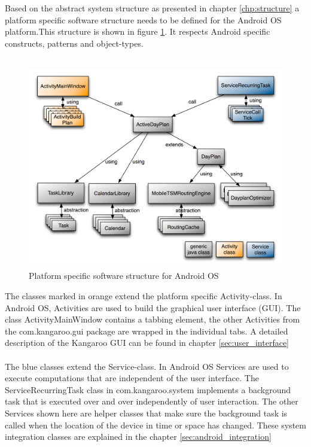 Based on the abstract system structure as presented in chapter \ref{chp:structure} a platform specific software structure needs to be defined for the Android OS platform.This structure is shown in figure \ref{android_structure}. It respects Android specific constructs, patterns and object-types.\\\\
\begin{figure}[h!]
\centering
\includegraphics[width=14cm]{pics/android_structure.png}
\caption{Platform specific software structure for Android OS}
\label{android_structure}
\end{figure}
The classes marked in orange extend the platform specific Activity-class. In Android OS, Activities are used to build the graphical user interface (GUI). The class ActivityMainWindow contains a tabbing element, the other Activities from the com.kangaroo.gui package are wrapped in the individual tabs. A detailed description of the Kangaroo GUI can be found in chapter \ref{sec:user_interface}\\\\
The blue classes extend the Service-class. In Android OS Services are used to execute computations that are independent of the user interface.  The ServiceRecurringTask class in com.kangaroo.system implements a background task that is executed over and over independently of user interaction. The other Services shown here are helper classes that make sure the background task is called when the location of the device in time or space has changed. These system integration classes are explained in the chapter \ref{sec:android_integration} \\\\
